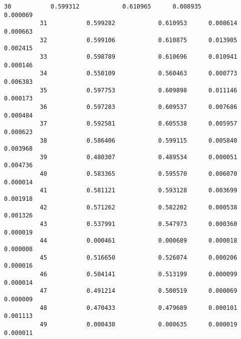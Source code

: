 \documentclass[11pt]{article}
\begin{document}
\begin{Verbatim}[commandchars=\\\{\}]
          30           0.599312            0.610965      0.008935        0.000069   
          31           0.599282            0.610953      0.008614        0.000663   
          32           0.599106            0.610875      0.013905        0.002415   
          33           0.598789            0.610696      0.010941        0.000146   
          34           0.550109            0.560463      0.000773        0.006383   
          35           0.597753            0.609898      0.011146        0.000173   
          36           0.597283            0.609537      0.007686        0.000484   
          37           0.592581            0.605538      0.005957        0.000623   
          38           0.586406            0.599115      0.005840        0.003968   
          39           0.480307            0.489534      0.000051        0.004736   
          40           0.583365            0.595570      0.006070        0.000014   
          41           0.581121            0.593128      0.003699        0.001918   
          42           0.571262            0.582202      0.000538        0.001326   
          43           0.537991            0.547973      0.000360        0.000019   
          44           0.000461            0.000689      0.000018        0.000008   
          45           0.516650            0.526074      0.000206        0.000016   
          46           0.504141            0.513199      0.000099        0.000014   
          47           0.491214            0.500519      0.000069        0.000009   
          48           0.470433            0.479689      0.000101        0.001113   
          49           0.000430            0.000635      0.000019        0.000011   
          

\end{Verbatim}
\end{document}
